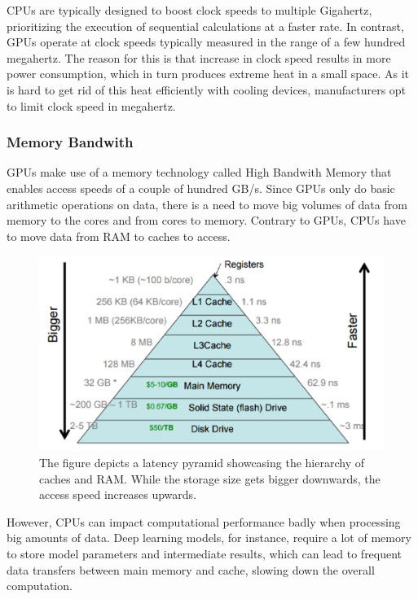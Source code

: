 \documentclass[conference]{IEEEtran}
\begin{document}
CPUs are typically designed to boost clock speeds to multiple Gigahertz, prioritizing the execution of sequential calculations at a faster rate. In contrast, GPUs operate at clock speeds typically measured in the range of a few hundred megahertz. The reason for this is that increase in clock speed results in more power consumption, which in turn produces extreme heat in a small space. As it is hard to get rid of this heat efficiently with cooling devices, manufacturers opt to limit clock speed in megahertz. \cite{b17}

\subsubsection{Memory Bandwith}

GPUs make use of a memory technology called High Bandwith Memory that enables access speeds of a couple of hundred GB/s. Since GPUs only do basic arithmetic operations on data, there is a need to move big volumes of data from memory to the cores and from cores to memory. Contrary to GPUs, CPUs have to move data from RAM to caches to access.\cite{b17}

\begin{figure}[H]
    \centering
    \includegraphics[scale=0.55]{l10-storage-hierarchy.png}
    \caption{The figure depicts a latency pyramid showcasing the hierarchy of caches and RAM. While the storage size gets bigger downwards, the access speed increases upwards.\cite{b24}}
    \label{fig:trad_2}
\end{figure} 

However, CPUs can impact computational performance badly when processing big amounts of data. Deep learning models, for instance, require a lot of memory to store model parameters and intermediate results, which can lead to frequent data transfers between main memory and cache, slowing down the overall computation.
\end{document}

